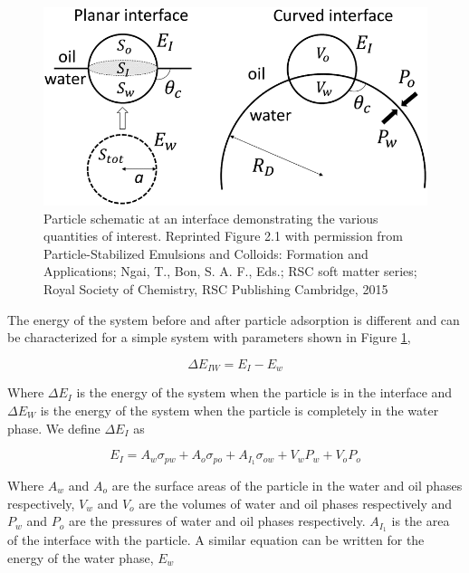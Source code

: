\begin{figure}
    \centering
    \includegraphics[scale = 0.5]{../figures/literature_review/particle_at_interface.png }
    \caption{Particle schematic at an interface demonstrating the various quantities of interest. Reprinted Figure 2.1 with permission from
             Particle-Stabilized Emulsions and Colloids: Formation and Applications; Ngai, T., Bon, S. A. F., Eds.; RSC soft matter series; 
             Royal Society of Chemistry, RSC Publishing Cambridge, 2015}
    \label{fig:pieranski_model}
\end{figure}

The energy of the system before and after particle adsorption is different and can be characterized for a simple system with parameters shown in Figure \ref{fig:pieranski_model},

\begin{equation}
    \Delta E_{IW} = E_I - E_w
\end{equation}

Where $\Delta E_{I}$ is the energy of the system when the particle is in the interface and $\Delta E_W$ is the energy of the system when the particle is completely in the water phase.
We define $\Delta E_{I}$ as

\begin{equation}
    E_I = A_w \sigma_{pw} + A_o\sigma_{po} + A_{I_1}\sigma_{ow} + V_w P_w + V_o P_o
\end{equation}

Where $A_w$ and $A_o$ are the surface areas of the particle in the water and oil phases respectively, $V_w$ and $V_o$ are the volumes of water and oil phases respectively and 
$P_w$ and $P_o$ are the pressures of water and oil phases respectively. $A_{I_1}$ is the area of the interface with the particle. 
A similar equation can be written for the energy of the water phase, $E_w$

